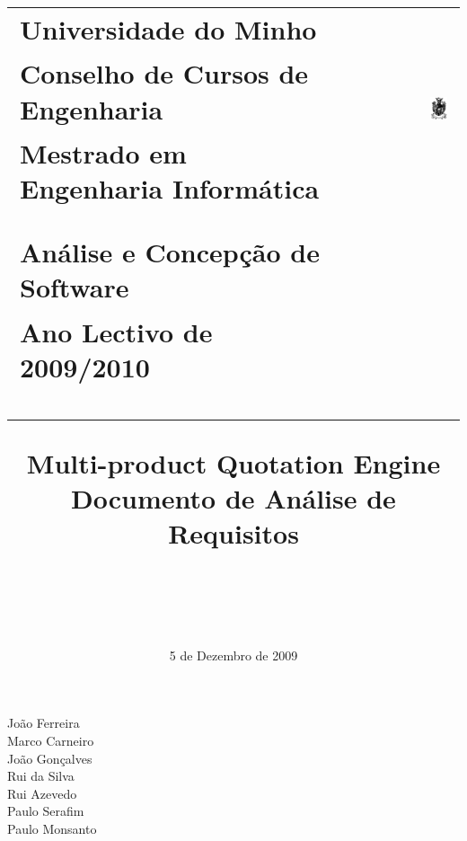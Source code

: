 
\title{	
	\begin{tabular}{l r}
	\large{Universidade do Minho} & \multirow{3}{*}{\includegraphics[width=0.2\textwidth]{images/UM}} \\
	\large{Conselho de Cursos de Engenharia} & \\
	\large{Mestrado em Engenharia Informática} & \\
	\\
	\\
	\Large{\textbf{Análise e Concepção de Software}} & \\
	\large{Ano Lectivo de 2009/2010} & \\
	\\
	\\
	\\
	\end{tabular}
	\textbf{Multi-product Quotation Engine\\Documento de Análise de Requisitos}\\\\\\
}

\date{5 de Dezembro de 2009}


	\begin{center}
	João Ferreira \\ 
	Marco Carneiro \\ 
	João Gonçalves \\
	Rui da Silva \\
	Rui Azevedo \\
	Paulo Serafim \\
	Paulo Monsanto \\
	\\ 
	\end{center}